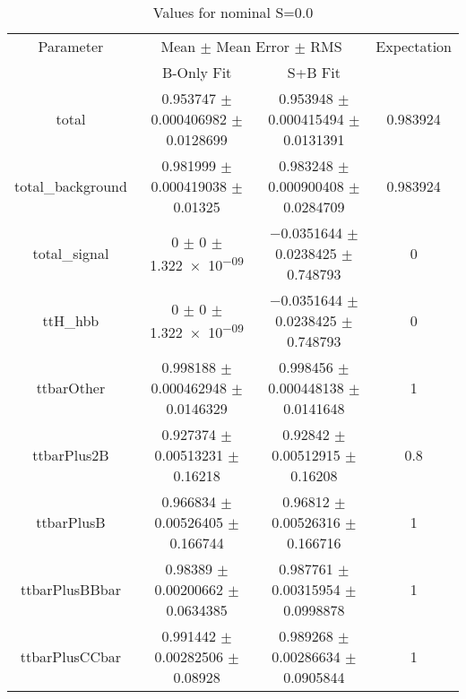 \begin{table}
\centering
\caption{Values for nominal S=0.0}
\begin{tabular}{cccc}
\toprule
Parameter & \multicolumn{2}{c}{Mean $\pm$ Mean Error $\pm$ RMS} & Expectation\\
 & B-Only Fit & S+B Fit & \\
\midrule
total & \num{0.953747} $\pm$ \num{0.000406982} $\pm$ \num{0.0128699} & \num{0.953948} $\pm$ \num{0.000415494} $\pm$ \num{0.0131391} & \num{0.983924}\\
total\_background & \num{0.981999} $\pm$ \num{0.000419038} $\pm$ \num{0.01325} & \num{0.983248} $\pm$ \num{0.000900408} $\pm$ \num{0.0284709} & \num{0.983924}\\
total\_signal & \num{0} $\pm$ \num{0} $\pm$ \num{1.322e-09} & \num{-0.0351644} $\pm$ \num{0.0238425} $\pm$ \num{0.748793} & \num{0}\\
ttH\_hbb & \num{0} $\pm$ \num{0} $\pm$ \num{1.322e-09} & \num{-0.0351644} $\pm$ \num{0.0238425} $\pm$ \num{0.748793} & \num{0}\\
ttbarOther & \num{0.998188} $\pm$ \num{0.000462948} $\pm$ \num{0.0146329} & \num{0.998456} $\pm$ \num{0.000448138} $\pm$ \num{0.0141648} & \num{1}\\
ttbarPlus2B & \num{0.927374} $\pm$ \num{0.00513231} $\pm$ \num{0.16218} & \num{0.92842} $\pm$ \num{0.00512915} $\pm$ \num{0.16208} & \num{0.8}\\
ttbarPlusB & \num{0.966834} $\pm$ \num{0.00526405} $\pm$ \num{0.166744} & \num{0.96812} $\pm$ \num{0.00526316} $\pm$ \num{0.166716} & \num{1}\\
ttbarPlusBBbar & \num{0.98389} $\pm$ \num{0.00200662} $\pm$ \num{0.0634385} & \num{0.987761} $\pm$ \num{0.00315954} $\pm$ \num{0.0998878} & \num{1}\\
ttbarPlusCCbar & \num{0.991442} $\pm$ \num{0.00282506} $\pm$ \num{0.08928} & \num{0.989268} $\pm$ \num{0.00286634} $\pm$ \num{0.0905844} & \num{1}\\
\bottomrule
\end{tabular}
\end{table}